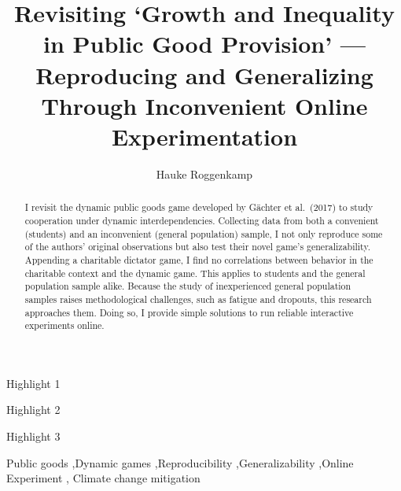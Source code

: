 \documentclass[
  authoryear,
  review,
  3p,
  onecolumn]{elsarticle}
\begin{document}
\begin{frontmatter}
\title{Revisiting `Growth and Inequality in Public Good Provision'
---Reproducing and Generalizing Through Inconvenient Online
Experimentation}
\author[1,2]{Hauke Roggenkamp%
%
}



        
\begin{abstract}
I revisit the dynamic public goods game developed by Gächter et
al.~(2017) to study cooperation under dynamic interdependencies.
Collecting data from both a convenient (students) and an inconvenient
(general population) sample, I not only reproduce some of the authors'
original observations but also test their novel game's generalizability.
Appending a charitable dictator game, I find no correlations between
behavior in the charitable context and the dynamic game. This applies to
students and the general population sample alike. Because the study of
inexperienced general population samples raises methodological
challenges, such as fatigue and dropouts, this research approaches them.
Doing so, I provide simple solutions to run reliable interactive
experiments online.
\end{abstract}



\begin{highlights}
\item Highlight 1\item Highlight 2\item Highlight 3
\end{highlights}


\begin{keyword}
    Public goods \sep Dynamic
games \sep Reproducibility \sep Generalizability \sep Online
Experiment \sep 
    Climate change mitigation
\end{keyword}
\end{frontmatter}\ifdefined\Shaded\renewenvironment{Shaded}{\begin{tcolorbox}[interior hidden, enhanced, sharp corners, boxrule=0pt, borderline west={3pt}{0pt}{shadecolor}, frame hidden, breakable]}{\end{tcolorbox}}\fi
\end{document}
